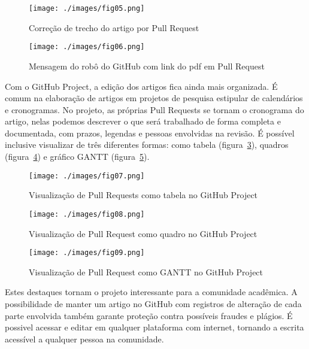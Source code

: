 \begin{figure}[H]
	\centering
	\texttt{[image: ./images/fig05.png]}
	\caption{Correção de trecho do artigo por Pull Request}
	\label{fig:fig05}
\end{figure}

\begin{figure}[H]
	\centering
	\texttt{[image: ./images/fig06.png]}
	\caption{Mensagem do robô do GitHub com link do pdf em Pull Request}
	\label{fig:fig06}
\end{figure}

Com o GitHub Project, a edição dos artigos fica ainda mais organizada. É comum na elaboração de artigos em projetos de pesquisa estipular de calendários e cronogramas. No projeto, as próprias Pull Requests se tornam o cronograma do artigo, nelas podemos descrever o que será trabalhado de forma completa e documentada, com prazos, legendas e pessoas envolvidas na revisão. É possível inclusive visualizar de três diferentes formas: como tabela (figura~\ref{fig:fig07}), quadros (figura~\ref{fig:fig08}) e gráfico GANTT (figura~\ref{fig:fig09}).

\begin{figure}[H]
	\centering
	\texttt{[image: ./images/fig07.png]}
	\caption{Visualização de Pull Requests como tabela no GitHub Project}
	\label{fig:fig07}
\end{figure}

\begin{figure}[ht]
	\centering
	\texttt{[image: ./images/fig08.png]}
	\caption{Visualização de Pull Request como quadro no GitHub Project}
	\label{fig:fig08}
\end{figure}

\begin{figure}[ht]
	\centering
	\texttt{[image: ./images/fig09.png]}
	\caption{Visualização de Pull Request como GANTT no GitHub Project}
	\label{fig:fig09}
\end{figure}

Estes destaques tornam o projeto interessante para a comunidade acadêmica. A possibilidade de manter um artigo no GitHub com registros de alteração de cada parte envolvida também garante proteção contra possíveis fraudes e plágios. É possivel acessar e editar em qualquer plataforma com internet, tornando a escrita acessível a qualquer pessoa na comunidade.

